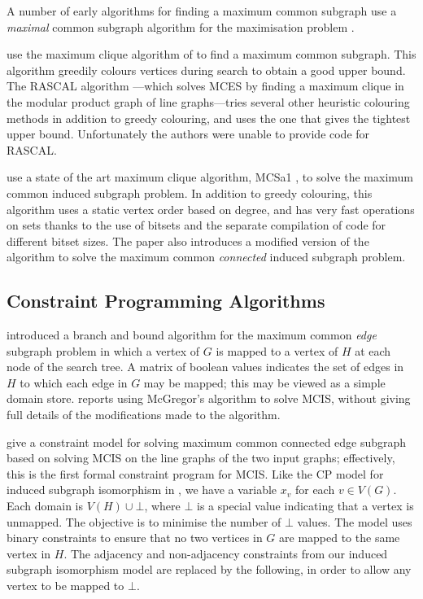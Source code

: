 A number of early algorithms for finding a maximum common subgraph use a \emph{maximal}
common subgraph algorithm \citep{DBLP:journals/cacm/BronK73} for the maximisation problem
\citep{durand1999efficient,DBLP:conf/mco/VismaraV08}.

\citet{DBLP:conf/sspr/BunkeFGSV02} use the maximum clique algorithm of
\citet{DBLP:journals/siamcomp/BalasY86} to find a maximum common subgraph.
This algorithm greedily colours vertices during search to obtain a good upper
bound.  The RASCAL algorithm \citep{raymond2002rascal}---which solves MCES by
finding a maximum clique in the modular product graph of line graphs---tries
several other heuristic colouring methods in addition to greedy colouring, and
uses the one that gives the tightest upper bound.  Unfortunately the authors
were unable to provide code for RASCAL.

\cite{DBLP:conf/cp/McCreeshNPS16} use a state of the art maximum clique
algorithm, MCSa1
\citep{DBLP:journals/algorithms/Prosser12,DBLP:journals/ieicet/TomitaSHW13},
to solve the maximum common induced subgraph problem.  In addition to greedy
colouring, this algorithm uses a static vertex order based on degree, and has
very fast operations on sets thanks to the use of bitsets and the separate
compilation of code for different bitset sizes.  The paper also introduces a
modified version of the algorithm to solve the maximum common \emph{connected}
induced subgraph problem.

\subsection{Constraint Programming Algorithms}

\citet{DBLP:journals/spe/McGregor82}
introduced a branch and bound algorithm for the maximum common
\emph{edge} subgraph problem in which a vertex of $G$ is mapped to a vertex
of $H$ at each node of the search tree.  A matrix of boolean values indicates
the set of edges in $H$ to which each edge in $G$ may be mapped; this may be
viewed as a simple domain store. \citet{DBLP:conf/sspr/BunkeFGSV02}
reports using McGregor's algorithm to solve MCIS, without giving full
details of the modifications made to the algorithm.

\citet{DBLP:conf/mco/VismaraV08} give a constraint model for solving maximum
common connected edge subgraph based on solving MCIS on the line graphs of the
two input graphs; effectively, this is the first formal constraint program for
MCIS.  Like the CP model for induced subgraph isomorphism in
, we have a variable $x_v$ for each $v \in V(G)$.
Each domain is $V(H) \cup \bot$, where $\bot$ is a special value indicating that
a vertex is unmapped.  The objective is to minimise the number of $\bot$
values.  The model uses binary constraints to ensure that no two vertices in
$G$ are mapped to the same vertex in $H$.  The adjacency and non-adjacency
constraints from our induced subgraph isomorphism model are replaced by the
following, in order to allow any vertex to be mapped to $\bot$.

